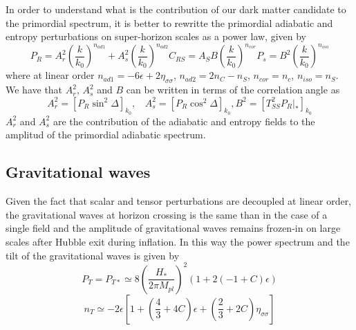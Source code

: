 \documentclass[a4paper,fleqn,usenatbib,useAMS]{mnras}
\begin{document}
In order to understand what is the contribution of our dark matter candidate to the primordial spectrum, it is better to rewritte the primordial adiabatic and entropy perturbations on super-horizon scales as a power law, given by
\begin{subequations}\label{PswAs}
\begin{equation}\label{PrAs}
P_R=A_r^2\left(\frac{k}{k_0}\right)^{n_{ad1}}+A_s^2\left(\frac{k}{k_0}\right)^{n_{ad2}}
\end{equation}
\begin{equation}\label{PrCrs}
C_{RS}=A_SB\left(\frac{k}{k_0}\right)^{n_{cor}}
\end{equation}
\begin{equation}\label{PsAs}
P_s=B^2\left(\frac{k}{k_0}\right)^{n_{iso}}
\end{equation}
\end{subequations}
where at linear order $n_{ad1}=-6\epsilon+2\eta_{\sigma\sigma}$, $n_{ad2}=2n_C-n_S$, $n_{cor}=n_c$, $n_{iso}=n_S$. We have that $A_r^2$, $A_s^2$ and $B$ can be written in terms of the correlation angle as
\begin{subequations}
\label{RelAs}
\begin{equation}
A_r^2=[P_R\sin^2\Delta]_{k_0}, \ \ \ \ A_s^2=[P_R\cos^2\Delta]_{k_0},
\end{equation}
\begin{equation}
B^2=[T_{SS}^2 P_R|_*]_{k_0}
\end{equation}
\end{subequations}
$A_r^2$ and $A_s^2$ are the contribution of the adiabatic and entropy fields to the amplitud of the primordial adiabatic spectrum. 
\subsection{Gravitational waves}

Given the fact that scalar and tensor perturbations are decoupled at linear order, the gravitational waves at horizon crossing is the same than in the case of a single field and the amplitude of gravitational waves remains frozen-in on large scales after Hubble exit during inflation. In this way the power spectrum and the tilt of the gravitational waves is given by
\begin{equation}
P_T=P_{T*}\simeq 8 \left(\frac{H_*}{2\pi M_{pl}}\right)^2(1+2(-1+C)\epsilon)
\end{equation}
\begin{equation}\label{tiltsnt}
n_T\simeq -2\epsilon\left[1+\left(\frac{4}{3}+4C\right)\epsilon+\left(\frac{2}{3}+2C\right)\eta_{\sigma\sigma}\right]
\end{equation}
\end{document}

